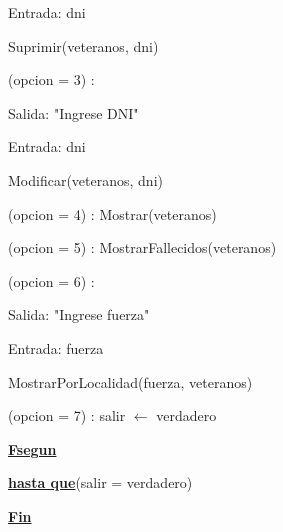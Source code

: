 \documentclass{article}
\begin{document}
        \hspace{16mm}Entrada: dni
        
        \hspace{16mm}Suprimir(veteranos, dni)

    \hspace{12mm}(opcion = 3) : 
    
        \hspace{16mm}Salida: "Ingrese DNI"

        \hspace{16mm}Entrada: dni
        
        \hspace{16mm}Modificar(veteranos, dni)

    \hspace{12mm}(opcion = 4) : Mostrar(veteranos)

    \hspace{12mm}(opcion = 5) : MostrarFallecidos(veteranos)

    \hspace{12mm}(opcion = 6) : 
    
        \hspace{16mm}Salida: "Ingrese fuerza"

        \hspace{16mm}Entrada: fuerza

        \hspace{16mm}MostrarPorLocalidad(fuerza, veteranos)

    \hspace{12mm}(opcion = 7) : salir $\leftarrow$ verdadero

    \hspace{8mm}\underline{\textbf{Fsegun}}

    \hspace{4mm}\underline{\textbf{hasta que}}(salir = verdadero)

    \underline{\textbf{Fin}}
\end{document}
